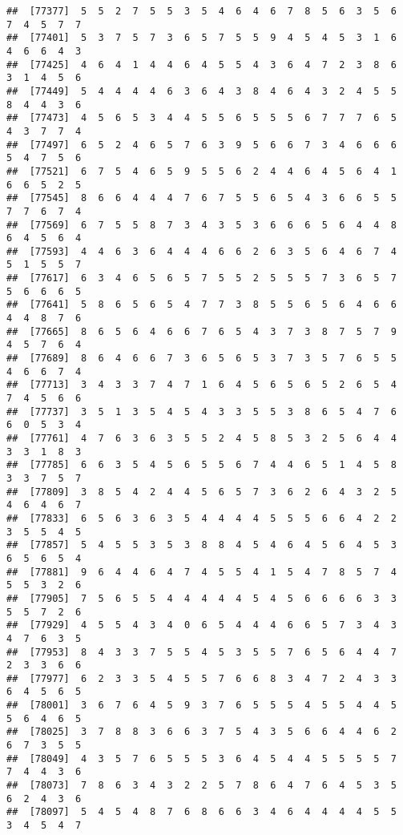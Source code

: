\documentclass[
]{book}
\begin{document}
\begin{verbatim}
##  [77377]  5  5  2  7  5  5  3  5  4  6  4  6  7  8  5  6  3  5  6  7  4  5  7  7
##  [77401]  5  3  7  5  7  3  6  5  7  5  5  9  4  5  4  5  3  1  6  4  6  6  4  3
##  [77425]  4  6  4  1  4  4  6  4  5  5  4  3  6  4  7  2  3  8  6  3  1  4  5  6
##  [77449]  5  4  4  4  4  6  3  6  4  3  8  4  6  4  3  2  4  5  5  8  4  4  3  6
##  [77473]  4  5  6  5  3  4  4  5  5  6  5  5  5  6  7  7  7  6  5  4  3  7  7  4
##  [77497]  6  5  2  4  6  5  7  6  3  9  5  6  6  7  3  4  6  6  6  5  4  7  5  6
##  [77521]  6  7  5  4  6  5  9  5  5  6  2  4  4  6  4  5  6  4  1  6  6  5  2  5
##  [77545]  8  6  6  4  4  4  7  6  7  5  5  6  5  4  3  6  6  5  5  7  7  6  7  4
##  [77569]  6  7  5  5  8  7  3  4  3  5  3  6  6  6  5  6  4  4  8  6  4  5  6  4
##  [77593]  4  4  6  3  6  4  4  4  6  6  2  6  3  5  6  4  6  7  4  5  1  5  5  7
##  [77617]  6  3  4  6  5  6  5  7  5  5  2  5  5  5  7  3  6  5  7  5  6  6  6  5
##  [77641]  5  8  6  5  6  5  4  7  7  3  8  5  5  6  5  6  4  6  6  4  4  8  7  6
##  [77665]  8  6  5  6  4  6  6  7  6  5  4  3  7  3  8  7  5  7  9  4  5  7  6  4
##  [77689]  8  6  4  6  6  7  3  6  5  6  5  3  7  3  5  7  6  5  5  4  6  6  7  4
##  [77713]  3  4  3  3  7  4  7  1  6  4  5  6  5  6  5  2  6  5  4  7  4  5  6  6
##  [77737]  3  5  1  3  5  4  5  4  3  3  5  5  3  8  6  5  4  7  6  6  0  5  3  4
##  [77761]  4  7  6  3  6  3  5  5  2  4  5  8  5  3  2  5  6  4  4  3  3  1  8  3
##  [77785]  6  6  3  5  4  5  6  5  5  6  7  4  4  6  5  1  4  5  8  3  3  7  5  7
##  [77809]  3  8  5  4  2  4  4  5  6  5  7  3  6  2  6  4  3  2  5  4  6  4  6  7
##  [77833]  6  5  6  3  6  3  5  4  4  4  4  5  5  5  6  6  4  2  2  3  5  5  4  5
##  [77857]  5  4  5  5  3  5  3  8  8  4  5  4  6  4  5  6  4  5  3  6  5  6  5  4
##  [77881]  9  6  4  4  6  4  7  4  5  5  4  1  5  4  7  8  5  7  4  5  5  3  2  6
##  [77905]  7  5  6  5  5  4  4  4  4  4  5  4  5  6  6  6  6  3  3  5  5  7  2  6
##  [77929]  4  5  5  4  3  4  0  6  5  4  4  4  6  6  5  7  3  4  3  4  7  6  3  5
##  [77953]  8  4  3  3  7  5  5  4  5  3  5  5  7  6  5  6  4  4  7  2  3  3  6  6
##  [77977]  6  2  3  3  5  4  5  5  7  6  6  8  3  4  7  2  4  3  3  6  4  5  6  5
##  [78001]  3  6  7  6  4  5  9  3  7  6  5  5  5  4  5  5  4  4  5  5  6  4  6  5
##  [78025]  3  7  8  8  3  6  6  3  7  5  4  3  5  6  6  4  4  6  2  6  7  3  5  5
##  [78049]  4  3  5  7  6  5  5  5  3  6  4  5  4  4  5  5  5  5  7  7  4  4  3  6
##  [78073]  7  8  6  3  4  3  2  2  5  7  8  6  4  7  6  4  5  3  5  6  2  4  3  6
##  [78097]  5  4  5  4  8  7  6  8  6  6  3  4  6  4  4  4  4  5  5  3  4  5  4  7

\end{verbatim}
\end{document}
